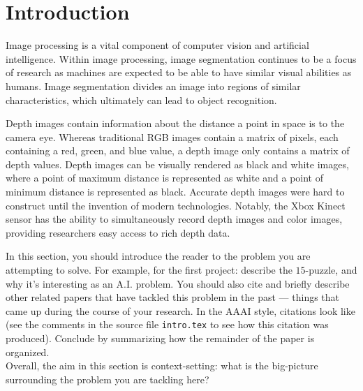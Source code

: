 
\section{Introduction}
\label{sec:intro}
Image processing is a vital component of computer vision and
artificial intelligence. Within image processing, image segmentation
continues to be a focus of research as machines are expected to be
able to have similar visual abilities as humans. Image segmentation
divides an image into regions of similar characteristics, which
ultimately can lead to object recognition. 

Depth images contain information about the distance a point in space
is to the camera eye. Whereas traditional RGB images contain a matrix
of pixels, each containing a red, green, and blue value, a depth image
only contains a matrix of depth values. Depth images can be visually
rendered as black and white images, where a point of maximum distance
is represented as white and a point of minimum distance is represented
as black. Accurate depth images were hard to construct until the
invention of modern technologies. Notably, the Xbox Kinect sensor
has the ability to simultaneously record depth images and color
images, providing researchers easy access to rich depth data. 

In this section, you should introduce the reader to the problem you
are attempting to solve. For example, for the first project: describe
the $15$-puzzle, and why it's interesting as an A.I. problem. You
should also cite and briefly describe other related papers that have
tackled this problem in the past --- things that came up during the
course of your research. In the AAAI style, citations look like
\cite{aima} (see the comments in the source file \texttt{intro.tex} to
see how this citation was produced). Conclude by summarizing how the
remainder of the paper is organized. \\


Overall, the aim in this section is context-setting: what is the
big-picture surrounding the problem you are tackling here?

